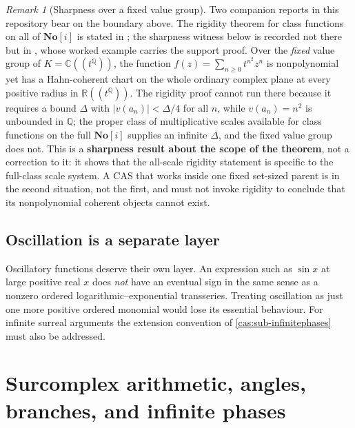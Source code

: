 \documentclass[11pt,letterpaper]{article}
\numberwithin{equation}{section}
\theoremstyle{definition}
\theoremstyle{remark}
\newtheorem{remark}[theorem]{Remark}
\newcommand{\No}{\mathbf{No}}
\newcommand{\R}{\mathbb R}
\newcommand{\C}{\mathbb C}
\newcommand{\Q}{\mathbb Q}
\begin{document}
\begin{remark}[Sharpness over a fixed value group]\label{cas:rem-rigiditysharp}
Two companion reports in this repository bear on the boundary above. The
rigidity theorem for class functions on all of $\No[i]$ is stated in
; the sharpness witness below is recorded not
there but in , whose
worked example carries the support proof. Over the \emph{fixed} value
group of $K=\C((t^\Q))$, the function $f(z)=\sum_{n\ge0}t^{n^2}z^n$ is
nonpolynomial yet has a Hahn-coherent chart on the whole ordinary complex plane
at every positive radius in $\R((t^\Q))$. The rigidity proof cannot run there
because it requires a bound $\Delta$ with $|v(a_n)|<\Delta/4$ for all $n$, while
$v(a_n)=n^2$ is unbounded in $\Q$; the proper class of multiplicative scales
available for class functions on the full $\No[i]$ supplies an infinite
$\Delta$, and the fixed value group does not. This is a \textbf{sharpness result
about the scope of the theorem}, not a correction to it: it shows that the
all-scale rigidity statement is specific to the full-class scale system. A CAS
that works inside one fixed set-sized parent is in the second situation, not the
first, and must not invoke rigidity to conclude that its nonpolynomial coherent
objects cannot exist.
\end{remark}

\subsection{Oscillation is a separate layer}
\label{cas:sub-oscillation}
Oscillatory functions deserve their own layer. An expression such as $\sin x$ at
large positive real $x$ does \emph{not} have an eventual sign in the same sense
as a nonzero ordered logarithmic--exponential transseries. Treating oscillation
as just one more positive ordered monomial would lose its essential behaviour.
For infinite surreal arguments the extension convention of
\cref{cas:sub-infinitephases} must also be addressed.

\section{Surcomplex arithmetic, angles, branches, and infinite phases}
\label{cas:sec-surcomplex}
\end{document}
